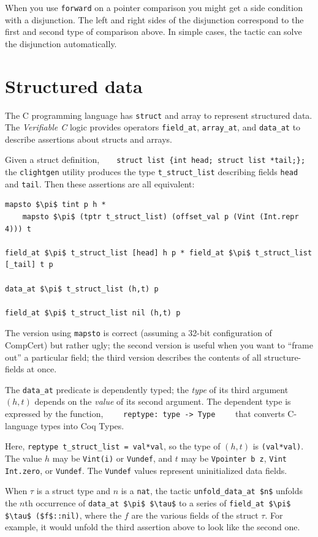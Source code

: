 \documentclass[12pt,fleqn,openany,oneside,showtrims]{memoir}
\newcommand{\ychapter}[2]{\chapter[#1]{#1 \hfill \normalsize #2}}
\begin{document}
When you use \lstinline|forward| on a pointer comparison you might get a side
condition with a disjunction. The left and right sides of the disjunction
correspond to the first and second type of comparison above. In simple cases,
the tactic can solve the disjunction automatically.

\ychapter{Structured data}{}
\label{refcard:structured}
The C programming language has \lstinline{struct} and array
to represent structured data.  The \emph{Verifiable C} logic
provides operators \lstinline{field_at},
\lstinline{array_at}, and \lstinline{data_at} to describe
assertions about structs and arrays.

Given a struct definition,~~~~\lstinline|struct list {int head; struct list *tail;};|\newline
the \lstinline{clightgen} utility produces the
type \lstinline{t_struct_list} describing fields
\lstinline{head} and \lstinline{tail}.
Then these assertions are all equivalent:

\begin{lstlisting}
mapsto $\pi$ tint p h * 
    mapsto $\pi$ (tptr t_struct_list) (offset_val p (Vint (Int.repr 4))) t

field_at $\pi$ t_struct_list [head] h p * field_at $\pi$ t_struct_list [_tail] t p

data_at $\pi$ t_struct_list (h,t) p

field_at $\pi$ t_struct_list nil (h,t) p
\end{lstlisting}
The version using \lstinline{mapsto} is correct (assuming a 32-bit 
configuration of CompCert) but rather ugly;
the second version is useful when
you want to ``frame out'' a 
particular field; the third version describes the contents
of all structure-fields at once.

The \lstinline{data_at} predicate is dependently typed;
the \emph{type} of its third argument $(h,t)$
depends on the \emph{value} of its second argument.
The dependent type is expressed by the
function,
$\qquad$\lstinline{reptype: type -> Type}$\qquad$
that converts C-language types into Coq Types.

Here, \lstinline{reptype t_struct_list = val*val}, so
the type of $(h,t)$ is \lstinline{(val*val)}.
The value $h$ may be \lstinline{Vint(i)} or \lstinline{Vundef},
and $t$ may be \lstinline{Vpointer b z},
\lstinline{Vint Int.zero}, or \lstinline{Vundef}.
The \lstinline{Vundef} values represent uninitialized
data fields.

When $\tau$ is a struct type and $n$ is a \lstinline{nat},
the tactic \lstinline{unfold_data_at $n$}
unfolds the $n$th occurrence of \lstinline{data_at $\pi$ $\tau$}
to a series of \lstinline{field_at $\pi$ $\tau$ ($f$::nil)},
where the $f$ are the various fields of the struct $\tau$.
For example, it would unfold the third assertion above
to look like the second one.
\end{document}
